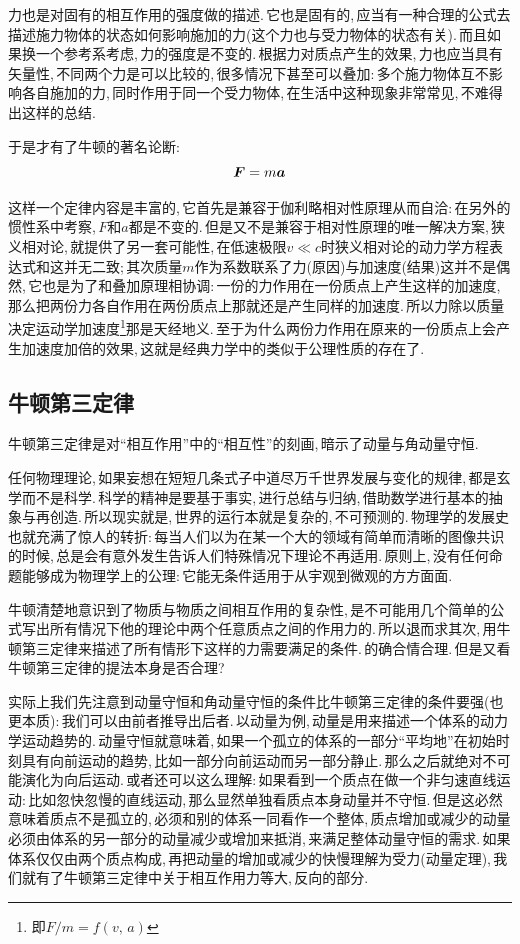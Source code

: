 力也是对固有的相互作用的强度做的描述.\,它也是固有的,\,应当有一种合理的公式去描述施力物体的状态如何影响施加的力(这个力也与受力物体的状态有关).\,而且如果换一个参考系考虑,\,力的强度是不变的.\,根据力对质点产生的效果,\,力也应当具有矢量性,\,不同两个力是可以比较的,\,很多情况下甚至可以叠加:\,多个施力物体互不影响各自施加的力,\,同时作用于同一个受力物体,\,在生活中这种现象非常常见,\,不难得出这样的总结.

于是才有了牛顿的著名论断:
\[\boldsymbol{F}=m\boldsymbol{a}\]

这样一个定律内容是丰富的,\,它首先是兼容于伽利略相对性原理从而自洽:\,在另外的惯性系中考察,\,$F$和$a$都是不变的.\,但是又不是兼容于相对性原理的唯一解决方案,\,狭义相对论,\,就提供了另一套可能性,\,在低速极限$v\ll c$时狭义相对论的动力学方程表达式和这并无二致;\,其次质量$m$作为系数联系了力(原因)与加速度(结果)这并不是偶然,\,它也是为了和叠加原理相协调:\,一份的力作用在一份质点上产生这样的加速度,\,那么把两份力各自作用在两份质点上那就还是产生同样的加速度.\,所以力除以质量决定运动学加速度\footnote{即$F/m=f(v,\,a)$}那是天经地义.\,至于为什么两份力作用在原来的一份质点上会产生加速度加倍的效果,\,这就是经典力学中的类似于公理性质的存在了.

\subsection{牛顿第三定律}
牛顿第三定律是对``相互作用''中的``相互性''的刻画,\,暗示了动量与角动量守恒.

任何物理理论,\,如果妄想在短短几条式子中道尽万千世界发展与变化的规律,\,都是玄学而不是科学.\,科学的精神是要基于事实,\,进行总结与归纳,\,借助数学进行基本的抽象与再创造.\,所以现实就是,\,世界的运行本就是复杂的,\,不可预测的.\,物理学的发展史也就充满了惊人的转折:\,每当人们以为在某一个大的领域有简单而清晰的图像共识的时候,\,总是会有意外发生告诉人们特殊情况下理论不再适用.\,原则上,\,没有任何命题能够成为物理学上的公理:\,它能无条件适用于从宇观到微观的方方面面.

牛顿清楚地意识到了物质与物质之间相互作用的复杂性,\,是不可能用几个简单的公式写出所有情况下他的理论中两个任意质点之间的作用力的.\,所以退而求其次,\,用牛顿第三定律来描述了所有情形下这样的力需要满足的条件.\,的确合情合理.\,但是又看牛顿第三定律的提法本身是否合理?

实际上我们先注意到动量守恒和角动量守恒的条件比牛顿第三定律的条件要强(也更本质):\,我们可以由前者推导出后者.\,以动量为例,\,动量是用来描述一个体系的动力学运动趋势的.\,动量守恒就意味着,\,如果一个孤立的体系的一部分``平均地''在初始时刻具有向前运动的趋势,\,比如一部分向前运动而另一部分静止.\,那么之后就绝对不可能演化为向后运动.\,或者还可以这么理解:\,如果看到一个质点在做一个非匀速直线运动:\,比如忽快忽慢的直线运动,\,那么显然单独看质点本身动量并不守恒.\,但是这必然意味着质点不是孤立的,\,必须和别的体系一同看作一个整体,\,质点增加或减少的动量必须由体系的另一部分的动量减少或增加来抵消,\,来满足整体动量守恒的需求.\,如果体系仅仅由两个质点构成,\,再把动量的增加或减少的快慢理解为受力(动量定理),\,我们就有了牛顿第三定律中关于相互作用力等大,\,反向的部分.

